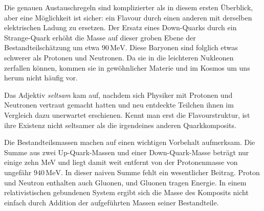 Die genauen Austauschregeln sind komplizierter als in diesem ersten Überblick, aber eine Möglichkeit ist sicher: ein Flavour durch einen anderen mit derselben elektrischen Ladung zu ersetzen. Der Ersatz eines Down-Quarks durch ein Strange-Quark erhöht die Masse auf dieser groben Ebene der Bestandteilschätzung um etwa \(90\,\mathrm{MeV}\). Diese Baryonen sind folglich etwas schwerer als Protonen und Neutronen. Da sie in die leichteren Nukleonen zerfallen können, kommen sie in gewöhnlicher Materie und im Kosmos um uns herum nicht häufig vor.

\begin{classroomqa}
\end{classroomqa}

\begin{classroomqa}
\end{classroomqa}

Das Adjektiv \emph{seltsam} kam auf, nachdem sich Physiker mit Protonen und Neutronen vertraut gemacht hatten und neu entdeckte Teilchen ihnen im Vergleich dazu unerwartet erschienen. Kennt man erst die Flavourstruktur, ist ihre Existenz nicht seltsamer als die irgendeines anderen Quarkkomposits.

Die Bestandteilsmassen machen auf einen wichtigen Vorbehalt aufmerksam. Die Summe aus zwei Up-Quark-Massen und einer Down-Quark-Masse beträgt nur einige zehn MeV und liegt damit weit entfernt von der Protonenmasse von ungefähr \(940\,\mathrm{MeV}\). In dieser naiven Summe fehlt ein wesentlicher Beitrag. Proton und Neutron enthalten auch Gluonen, und Gluonen tragen Energie. In einem relativistischen gebundenen System ergibt sich die Masse des Komposits nicht einfach durch Addition der aufgeführten Massen seiner Bestandteile.

\begin{classroomqa}
\end{classroomqa}

